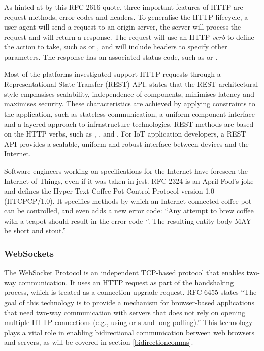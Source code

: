         As hinted at by this RFC 2616 quote, three important features of HTTP are request methods, error codes and headers. To generalise the HTTP lifecycle, a user agent will send a request to an origin server, the server will process the request and will return a response. The request will use an HTTP \emph{verb} to define the action to take, such as  or , and will include headers to specify other parameters. The response has an associated status code, such as  or .

        Most of the platforms investigated support HTTP requests through a Representational State Transfer (REST) API. \citet{rest:2000} states that the REST architectural style emphasises scalability, independence of components, minimises latency and maximises security. These characteristics are achieved by applying constraints to the application, such as stateless communication, a uniform component interface and a layered approach to infrastructure technologies. REST methods are based on the HTTP verbs, such as , ,  and . For IoT application developers, a REST API provides a scalable, uniform and robust interface between devices and the Internet.

        Software engineers working on specifications for the Internet have foreseen the Internet of Things, even if it was taken in jest. RFC 2324 \citep{rfc2324} is an April Fool's joke and defines the Hyper Text Coffee Pot Control Protocol version 1.0 (HTCPCP/1.0). It specifies methods by which an Internet-connected coffee pot can be controlled, and even adds a new error code: ``Any attempt to brew coffee with a teapot should result in the error code `'. The resulting entity body MAY be short and stout.''

      \subsubsection{WebSockets}
        The WebSocket Protocol is an independent TCP-based protocol that enables two-way communication. It uses an HTTP request as part of the handshaking process, which is treated as a connection upgrade request. RFC 6455 \citep{rfc6455} states ``The goal of this technology is to provide a mechanism for browser-based applications that need two-way communication with servers that does not rely on opening multiple HTTP connections (e.g., using  or s and long polling).'' This technology plays a vital role in enabling bidirectional communication between web browsers and servers, as will be covered in section \ref{bidirectioncomms}.

